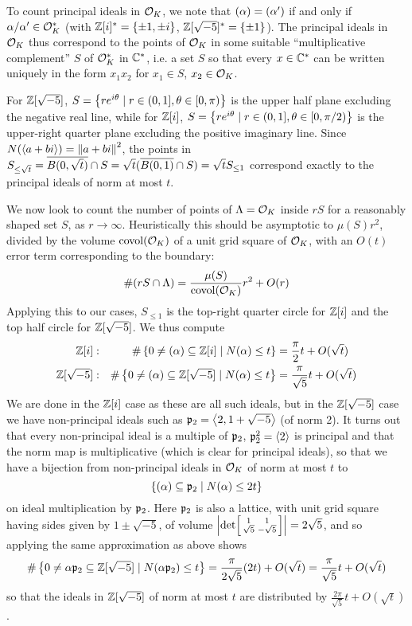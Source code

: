 \documentclass[11pt]{article}
\begin{document}
To count principal ideals in $\mathcal{O}_K$, we note that $(\alpha) = (\alpha')$ if and only if $\alpha/\alpha' \in \mathcal{O}_K^*$ (with $\mathbb{Z}[i]^* = \left\{  \pm 1, \pm i  \right\}$, $\mathbb{Z}[\sqrt{-5}]^* = \left\{  \pm 1  \right\}$). The principal ideals in $\mathcal{O}_K$ thus correspond to the points of $\mathcal{O}_K$ in some suitable ``multiplicative complement'' $S$ of $\mathcal{O}_K^*$ in $\mathbb{C}^*$, i.e. a set $S$ so that every $x \in \mathbb{C}^*$ can be written uniquely in the form $x_1x_2$ for $x_1 \in S$, $x_2 \in \mathcal{O}_K$. 

For $\mathbb{Z}[\sqrt{-5}]$, $S = \left\{  re^{i\theta} \mid r \in (0, 1], \theta \in [0, \pi)  \right\}$ is the upper half plane excluding the negative real line, while for $\mathbb{Z}[i]$, $S = \left\{  re^{i\theta} \mid r \in (0, 1], \theta \in [0, \pi/2)  \right\}$ is the upper-right quarter plane excluding the positive imaginary line. Since $N(\left\langle a + bi \right\rangle) = \left\| a + bi \right\|^2$, the points in $S_{\leq \sqrt{t}} = \overline{B(0, \sqrt{t})} \cap S = \sqrt{t}(\overline{B(0, 1)} \cap S) = \sqrt{t}S_{\leq 1}$ correspond exactly to the principal ideals of norm at most $t$. 

We now look to count the number of points of $\Lambda = \mathcal{O}_K$ inside $rS$ for a reasonably shaped set $S$, as $r \to \infty$. Heuristically this should be asymptotic to $\mu(S)r^2$, divided by the volume $\operatorname{covol}(\mathcal{O}_K)$ of a unit grid square of $\mathcal{O}_K$, with an $O(t)$ error term corresponding to the boundary:
$$
    \#(rS \cap \Lambda) = \frac{\mu(S)}{\operatorname{covol}(\mathcal{O}_K)}r^2 + O(r)
$$
Applying this to our cases, $S_{\leq 1}$ is the top-right quarter circle for $\mathbb{Z}[i]$ and the top half circle for $\mathbb{Z}[\sqrt{-5}]$. We thus compute
\begin{align*}
    \mathbb{Z}[i]: &&\#\left\{  0 \neq (\alpha) \subseteq \mathbb{Z}[i] \mid N(\alpha) \leq t  \right\} &= \frac{\pi}{2}t + O(\sqrt{t}) \\
    \mathbb{Z}[\sqrt{-5}]: &&\#\left\{  0 \neq (\alpha) \subseteq \mathbb{Z}[\sqrt{-5}] \mid N(\alpha) \leq t  \right\} &= \frac{\pi}{\sqrt{5}}t + O(\sqrt{t})
\end{align*}
We are done in the $\mathbb{Z}[i]$ case as these are all such ideals, but in the $\mathbb{Z}[\sqrt{-5}]$ case we have non-principal ideals such as $\mathfrak{p}_2 = \left\langle 2, 1 + \sqrt{-5} \right\rangle$ (of norm 2). It turns out that every non-principal ideal is a multiple of $\mathfrak{p}_2$, $\mathfrak{p}_2^2 = \left\langle 2 \right\rangle$ is principal and that the norm map is multiplicative (which is clear for principal ideals), so that we have a bijection from non-principal ideals in $\mathcal{O}_K$ of norm at most $t$ to
$$
    \left\{  (\alpha) \subseteq \mathfrak{p}_2 \mid N(\alpha) \leq 2t  \right\}
$$
on ideal multiplication by $\mathfrak{p}_2$. Here $\mathfrak{p}_2$ is also a lattice, with unit grid square having sides given by $1 \pm \sqrt{-5}$, of volume $\left| \det\begin{bsmallmatrix}
    1 & 1 \\
    \sqrt{5} & -\sqrt{5}
\end{bsmallmatrix} \right| = 2\sqrt{5}$, and so applying the same approximation as above shows
$$
    \#\left\{  0 \neq \alpha \mathfrak{p}_2 \subseteq \mathbb{Z}[\sqrt{-5}] \mid N(\alpha \mathfrak{p}_2) \leq t  \right\} = \frac{\pi}{2\sqrt{5}}(2t) + O(\sqrt{t}) = \frac{\pi}{\sqrt{5}}t + O(\sqrt{t})
$$
so that the ideals in $\mathbb{Z}[\sqrt{-5}]$ of norm at most $t$ are distributed by $\frac{2\pi}{\sqrt{5}}t + O(\sqrt{t})$.
\end{document}
